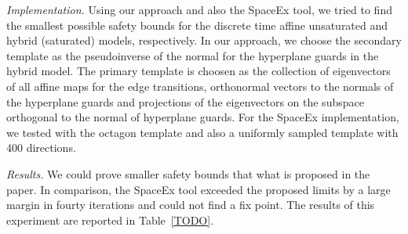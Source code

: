 \emph{Implementation.}  Using our approach and also the SpaceEx tool,
we tried to find the smallest possible safety bounds for the discrete
time affine unsaturated and hybrid (saturated) models, respectively.
In our approach, we choose the secondary template as the pseudoinverse
of the normal for the hyperplane guards in the hybrid model.  The
primary template is choosen as the collection of eigenvectors of all
affine maps for the edge transitions, orthonormal vectors to the
normals of the hyperplane guards and projections of the eigenvectors
on the subspace orthogonal to the normal of hyperplane guards.  For
the SpaceEx implementation, we tested with the octagon template and
also a uniformly sampled template with 400 directions.

\emph{Results.}  We could prove smaller safety bounds that what is
proposed in the paper.  In comparison, the SpaceEx tool exceeded the
proposed limits by a large margin in fourty iterations and could not
find a fix point.  The results of this experiment are reported in
Table~\ref{TODO}.

